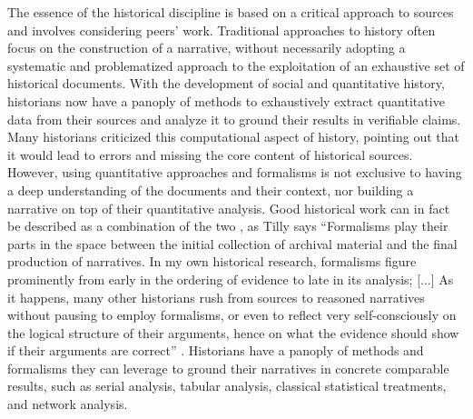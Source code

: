 

The essence of the historical discipline is based on a critical approach to sources and involves considering peers' work.
Traditional approaches to history often focus on the construction of a narrative, without necessarily adopting a systematic and problematized approach to the exploitation of an exhaustive set of historical documents\cite{tillyObservationsSocialProcesses2004}.
With the development of social and quantitative history, historians now have a panoply of methods to exhaustively extract quantitative data from their sources and analyze it to ground their results in verifiable claims.
Many historians criticized this computational aspect of history\cite{lepetitHistoireQuantitativeDeux1989, fogelLimitsQuantitativeMethods1975}, pointing out that it would lead to errors and missing the core content of historical sources.
However, using quantitative approaches and formalisms is not exclusive to having a deep understanding of the documents and their context, nor building a narrative on top of their quantitative analysis.
Good historical work can in fact be described as a combination of the two \cite{karila-cohenNouvellesCuisinesHistoire2018}, as Tilly says ``Formalisms play their parts in the space between the initial collection of archival material and the final production of narratives. In my own historical research, formalisms figure prominently from early in the ordering of evidence to late in its analysis; [...] As it happens, many other historians rush from sources to reasoned narratives without pausing to employ formalisms, or even to reflect very self-consciously on the logical structure of their arguments, hence on what the evidence should show if their arguments are correct'' \cite{tillyObservationsSocialProcesses2004}.
Historians have a panoply of methods and formalisms they can leverage to ground their narratives in concrete comparable results, such as serial analysis, tabular analysis, classical statistical treatments, and network analysis.

